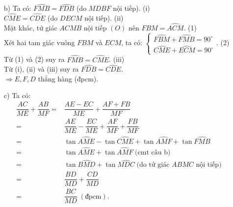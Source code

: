 \begin{bt}
{{}
\begin{enumerate}
\item[b)] Ta có: $ \widehat{FMB}=\widehat{FDB}$ (do $MDBF$ nội tiếp). \hfill (i)\\
$\widehat{CME}=\widehat{CDE}$ (do $DECM$ nội tiếp). \hfill (ii)\\
Mặt khác, tứ giác $ACMB$ nội tiếp $(O)$ nên $\widehat{FBM}=\widehat{ACM}$. \hfill (1)\\
Xét hai tam giác vuông $FBM$ và $ECM$, ta có:
$\begin{cases}
\widehat{FBM}+\widehat{FMB}=90^\circ\\
\widehat{CME}+\widehat{ECM}=90^\circ
\end{cases}$.  \hfill (2)\\
Từ (1) và (2) suy ra $\widehat{FMB}=\widehat{CME}$. \hfill (iii)\\
Từ (i), (ii) và (iii) suy ra $\widehat{FDB}=\widehat{CDE}$.\\
$\Rightarrow E,F,D$ thẳng hàng (đpcm).
\item[c)] Ta có:
\begin{align*}
\dfrac{AC}{ME}+\dfrac{AB}{MF}=&\dfrac{AE-EC}{ME}+\dfrac{AF+FB}{MF}\\
=&\dfrac{AE}{ME}-\dfrac{EC}{ME}+\dfrac{AF}{MF}+\dfrac{FB}{MF}\\
=&\tan \widehat{AME}-\tan \widehat{CME}+\tan \widehat{AMF}+\tan \widehat{FMB} \\
=&\tan \widehat{AME}+\tan \widehat{AMF}\; \text{(cmt câu b)}\\
=&\tan \widehat{BMD}+\tan \widehat{MDC}\; \text{(do tứ giác $ABMC$ nội tiếp)}\\
=&\dfrac{BD}{MD}+\dfrac{CD}{MD}&\\
=&\dfrac{BC}{MD}\; (\text{đpcm}).
\end{align*}
\end{enumerate}
}
\end{bt}

